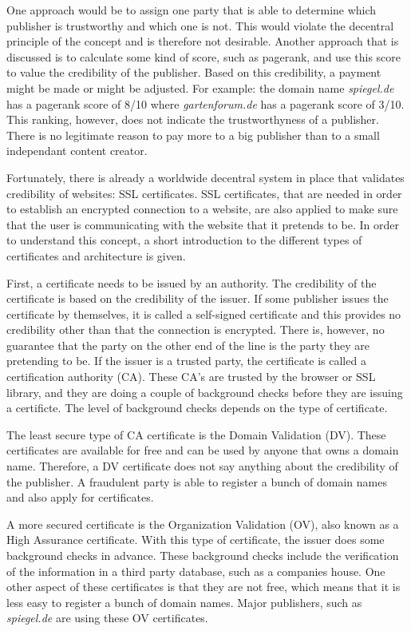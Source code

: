 One approach would be to assign one party that is able to determine which publisher is trustworthy and which one is not. This would violate the decentral principle of the concept and is therefore not desirable. Another approach that is discussed is to calculate some kind of score, such as pagerank, and use this score to value the credibility of the publisher. Based on this credibility, a payment might be made or might be adjusted. For example: the domain name \textit{spiegel.de} has a pagerank score of 8/10 where \textit{gartenforum.de} has a pagerank score of 3/10. This ranking, however, does not indicate the trustworthyness of a publisher. There is no legitimate reason to pay more to a big publisher than to a small independant content creator. 

Fortunately, there is already a worldwide decentral system in place that validates credibility of websites: SSL certificates. SSL certificates, that are needed in order to establish an encrypted connection to a website, are also applied to make sure that the user is communicating with the website that it pretends to be. In order to understand this concept, a short introduction to the different types of certificates and architecture is given. 

First, a certificate needs to be issued by an authority. The credibility of the certificate is based on the credibility of the issuer. If some publisher issues the certificate by themselves, it is called a self-signed certificate and this provides no credibility other than that the connection is encrypted. There is, however, no guarantee that the party on the other end of the line is the party they are pretending to be. If the issuer is a trusted party, the certificate is called a certification authority (CA). These CA's are trusted by the browser or SSL library, and they are doing a couple of background checks before they are issuing a certificte. The level of background checks depends on the type of certificate. 

The least secure type of CA certificate is the Domain Validation (DV). These certificates are available for free and can be used by anyone that owns a domain name. Therefore, a DV certificate does not say anything about the credibility of the publisher. A fraudulent party is able to register a bunch of domain names and also apply for certificates.

A more secured certificate is the Organization Validation (OV), also known as a High Assurance certificate. With this type of certificate, the issuer does some background checks in advance. These background checks include the verification of the information in a third party database, such as a companies house. One other aspect of these certificates is that they are not free, which means that it is less easy to register a bunch of domain names. Major publishers, such as \textit{spiegel.de} are using these OV certificates.

